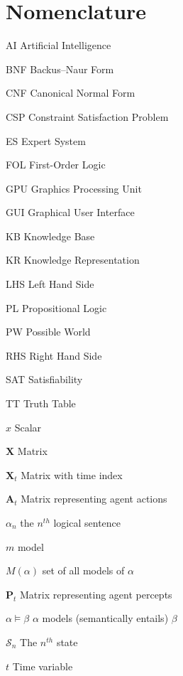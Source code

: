 \chapter{Nomenclature}
\label{nomenclature}

\begin{Nomencl}[4em]
	
	\item[AI] Artificial Intelligence
	\item[BNF] Backus–Naur Form  
	\item[CNF] Canonical Normal Form
	\item[CSP] Constraint Satisfaction Problem
	\item[ES] Expert System 	
	\item[FOL] First-Order Logic
	\item[GPU] Graphics Processing Unit
	\item[GUI] Graphical User Interface
    \item[KB] Knowledge Base
    \item[KR] Knowledge Representation
    \item[LHS] Left Hand Side
    \item[PL] Propositional Logic
    \item[PW] Possible World
    \item[RHS] Right Hand Side
    \item[SAT] Satisfiability
    \item[TT] Truth Table
    
   
	\item[$x$] Scalar
	\item[$\mathbf{X}$] Matrix
   	\item[$\mathbf{X}_t$] Matrix with time index 



   
   \item[$\mathbf{A}_t$] Matrix representing agent actions 
   
   	\item[$\alpha_n$]  the $n^{th}$ logical sentence
   	\item[$m$]  model
   	\item[$M(\alpha)$]  set of all models of $\alpha$
	\item[$\mathbf{P}_t$] Matrix representing agent percepts   
   	\item[$\alpha \models \beta$]  $\alpha$ models (semantically entails) $\beta$
   	\item[$\mathcal{S}_n$] The $n^{th}$ state
   	\item[$t$] Time variable



\end{Nomencl}


\endinput
